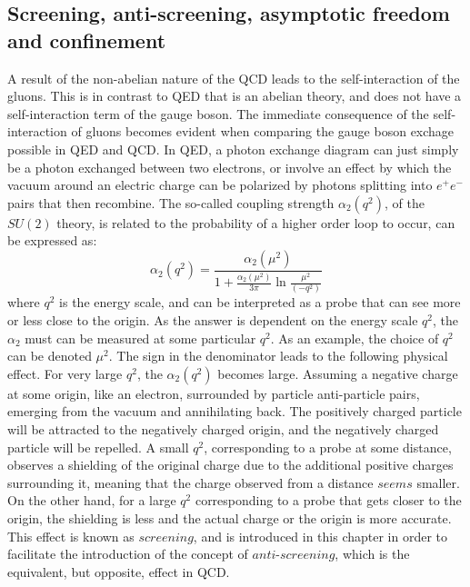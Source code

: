 \subsection*{Screening, anti-screening, asymptotic freedom and confinement}\label{sec:alpha} 
\noindent\justify
A result of the non-abelian nature of the QCD leads to the self-interaction of the gluons.
This is in contrast to QED that is an abelian theory, and does not have a self-interaction term of the gauge boson. 
The immediate consequence of the self-interaction of gluons becomes evident when comparing the gauge boson exchage possible in QED and QCD. 
In QED, a photon exchange diagram can just simply be a photon exchanged between two electrons, or involve an effect by which the vacuum around an electric charge can be polarized by photons splitting into $e^{+}e^{-}$ pairs that then recombine. 
The so-called coupling strength $\alpha_{2}(q^{2})$, of the $SU(2)$ theory, is related to the probability of a higher order loop to occur, can be expressed as\cite{Kane:2244793}:  
\begin{equation}
\alpha_{2}(q^{2})=\frac{\alpha_{2}(\mu^{2})}{1+\frac{\alpha_{2}(\mu^{2})}{3\pi}\ln\frac{\mu^{2}}{(-q^{2})}}
\label{eq:QEDalpha}
\end{equation}
where $q^{2}$ is the energy scale, and can be interpreted as a probe that can see more or less close to the origin. 
As the answer is dependent on the energy scale $q^{2}$, the $\alpha_{2}$ must can be measured at some particular $q^{2}$. As an example, the choice of $q^{2}$ can be denoted $\mu^{2}$.
The sign in the denominator leads to the following physical effect. 
For very large $q^{2}$, the $\alpha_{2}(q^{2})$ becomes large. 
Assuming a negative charge at some origin, like an electron, surrounded by particle anti-particle pairs, emerging from the vacuum and annihilating back. 
The positively charged particle will be attracted to the negatively charged origin, and the negatively charged particle will be repelled.   
A small $q^{2}$, corresponding to a probe at some distance, observes a shielding of the original charge due to the additional positive charges surrounding it, meaning that the charge observed from a distance $seems$ smaller. 
On the other hand, for a large $q^{2}$ corresponding to a probe that gets closer to the origin, the shielding is less and the actual charge or the origin is more accurate. 
This effect is known as $screening$, and is introduced in this chapter in order to facilitate the introduction of the concept of $anti$-$screening$, which is the equivalent, but opposite, effect in QCD.
